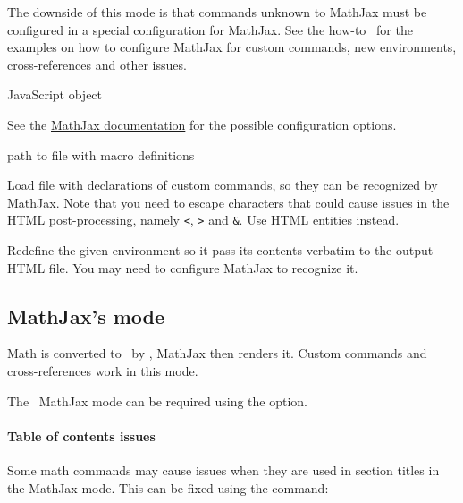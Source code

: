 The downside of this mode is that commands unknown to MathJax must be configured in a special configuration for
MathJax. See the how-to~ for the examples 
on how to configure MathJax for custom commands, new environments, cross-references
and other issues.

 {JavaScript object}\EndDoc

See the \href{https://docs.mathjax.org/en/latest/options/index.html}{MathJax documentation}
for the possible configuration options. 



 {path to file with macro definitions}\EndDoc

Load file with declarations of custom commands, so they can be recognized 
by MathJax. Note that you need to escape characters that could cause issues
in the HTML post-processing, namely \verb|<|, \verb|>| and \verb|&|. Use 
HTML entities instead.


Redefine the given environment so it pass its contents verbatim to the output HTML file.
You may need to configure MathJax to recognize it.



\subsection{MathJax's \mathml{} mode}

Math is converted to \mathml\ by \texfourht, MathJax then renders it. Custom
commands and cross-references work in this mode.

The \mathml\ MathJax mode can be required using the  option.

\paragraph{Table of contents issues}

Some math commands may cause issues when they are used in section titles in the MathJax mode. 
This can be fixed using the \texcommand{\fixmathjaxtoc} command:

\begin{texsource}
\fixmathjaxtoc\int
\end{texsource}

